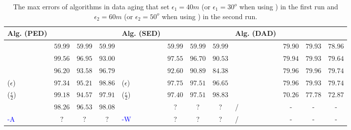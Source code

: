 {\begin{table}
	\caption{\small The max errors of algorithms in data aging that set $\epsilon_1=40m$ (or $\epsilon_1=30^o$ when using \dad) in the first run and $\epsilon_2=60m$ (or $\epsilon_2=50^o$ when using \dad) in the second run.}
	\centering
	\scriptsize
	\vspace{-1ex}
	\begin{tabular}{|l|c|c|c|l|c|c|c|l|c|c|c|}
		\hline
		\bf{Alg. (PED)}  &\ucar &\geolife &\mopsi & \bf{Alg. (SED)}  &\ucar &\geolife &\mopsi &\bf{Alg. (DAD)}  &\ucar &\geolife &\mopsi \\
		\hline
		{\dpa} &	$59.99$ & $59.99 $ &	$59.99$	&\dpa &$59.99$ &$59.99$ & $59.99$ & \dpa	& $79.90$	& $79.93$	& $78.96 $ \\
		\hline
		{\tpa} &	$99.56$ & $96.95$ &	$93.00$	&\tpa 	& $97.55$& $96.70$ &$90.53$ & \tpa	& $79.94$	& $79.93$	& $79.64$ \\
		\hline
		{\bqsa} &	$96.20 $ & $93.58  $ &	$96.79 $	&\squishe &$92.60$ &$90.89$ & $84.38$ & \opwa	& $79.96$	& $79.96$	& $79.74$ \\
		\hline
		{\siped($\epsilon$)} &	$97.34   $ & $95.21  $ &	$98.86   $	&\cised($\epsilon$) & $97.75$ &$97.51$ &$96.65$ & \interval	& $79.96$	& $79.93$	& $79.74$ \\
		\hline
		{\siped($\frac{\epsilon}{2}$)} &	$99.18  $ & $94.57  $ &	$97.91  $ &\cised($\frac{\epsilon}{2}$) &$ 97.40 $ & $97.51$ & $98.83$& \intersec	& $70.26 $	& $77.78$	& $72.87$ \\
		\hline
		{\operb} &	${98.26} $ & ${96.53} $ & ${98.08} $	& \textcolor{blue}{\dagots} &? &? &? & / &- &- &- \\
		\hline
		\textcolor{blue}{\operb-A} &	${?} $ & ${?} $ & ${?} $	& \textcolor{blue}{\cised-W} &? &? &? & / &- &- &- \\
		\hline
	\end{tabular}
	\label{tab:aging-me}

	\vspace{-2ex}
\end{table}


}
